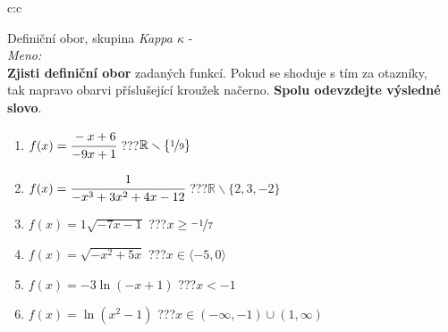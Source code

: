 \documentclass[10pt]{report}
\begin{document}
\newpage
\thispagestyle{empty}
\begin{tabular}{c:c}
\begin{minipage}[c][99mm][t]{0.49\linewidth}
\begin{center}
\vspace{7mm}
{\huge Definiční obor, skupina \textit{Kappa $\kappa$} -}\\[4.5mm]
\textit{Meno:}\phantom{xxxxxxxxxxxxxxxxxxxxxxxxxxxxxxxxxxxxxxxxxxxxxxxxxxxxxxxxxxxxxxxxx}\\[3.5mm]
\textbf{Zjisti definiční obor} zadaných funkcí. Pokud se shoduje s tím za otazníky,\\tak napravo obarvi příslušející kroužek načerno. \textbf{Spolu odevzdejte výsledné slovo}.\\[3mm]
\begin{minipage}{0.77\linewidth}
\begin{center}
\begin{varwidth}{\textwidth}
\begin{enumerate}
\normalsize
\item $f(x)=\cfrac{-x+6}{-9x+1}$\quad \dotfill\; ???\;\dotfill \quad $\mathbb{R}\smallsetminus\{\nicefrac{1}{9}\}$
\item $f(x)=\cfrac{1}{-x^3+3x^2+4x-12}$\quad \dotfill\; ???\;\dotfill \quad $\mathbb{R}\smallsetminus\{2,3,-2\}$
\item $f(x)=1\sqrt{-7x-1}$\quad \dotfill\; ???\;\dotfill \quad $x\geq\nicefrac{-1}{7}$
\item $f(x)=\sqrt{-x^2+5x}$\quad \dotfill\; ???\;\dotfill \quad $x\in\langle-5 , 0\rangle$
\item $f(x)=-3\ln{(-x+1)}$\quad \dotfill\; ???\;\dotfill \quad $x<-1$
\item $f(x)=\ln{(x^2-1)}$\quad \dotfill\; ???\;\dotfill \quad $x\in(-\infty , -1)\cup(1 , \infty)$
\end{enumerate}
\end{varwidth}
\end{center}
\end{minipage}
\begin{minipage}{0.20\linewidth}

\end{minipage}
\end{center}
\end{minipage}
\end{tabular}
\end{document}
